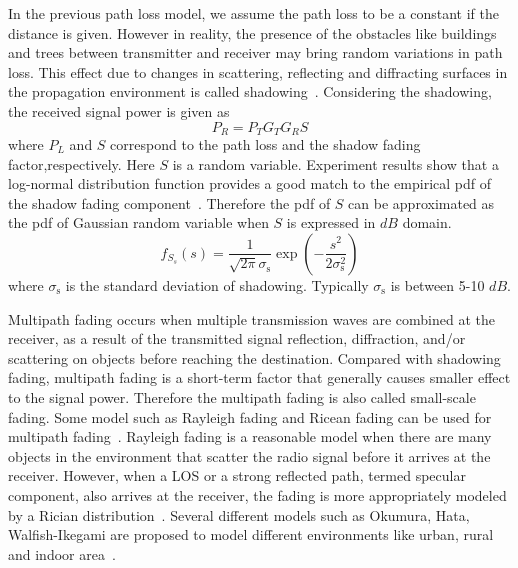 In the previous path loss model, we assume the path loss to be a constant if the distance is given. However in reality, the presence of the obstacles like buildings and trees between transmitter and receiver may bring random variations in path loss. This effect due to changes in scattering, reflecting and diffracting surfaces in the propagation environment is called shadowing~\cite{rappaport1996wireless}. Considering the shadowing, the received signal power is given as
\begin{equation}
P_{R} = P_{T} G_{T} G_{R} S
\end{equation}
where $P_{L}$ and $S$ correspond to the path loss and the shadow fading factor,respectively. Here $S$ is a random variable.
Experiment results show that a log-normal distribution function provides a good match to the empirical pdf of the shadow fading component~\cite{bertoni1999radio}. Therefore the pdf of $S$ can be approximated as the pdf of Gaussian random variable when $S$ is expressed in $dB$ domain.
\begin{equation} 
f_{S_{s}} (s)
= \frac{1}{\sqrt{2 \pi} \sigma_{\mathrm{s}}} 
\exp \left( - \frac{s^2}{2 \sigma_{\mathrm{s}}^2} \right)
\end{equation}
where $\sigma_{\mathrm{s}}$ is the standard deviation of shadowing. Typically $\sigma_{\mathrm{s}}$ is between 5-10 $dB$.

Multipath fading occurs when multiple transmission waves are combined
at the receiver, as a result of the transmitted signal reflection, diffraction, and/or scattering on objects before reaching the destination. Compared with shadowing fading, multipath fading is a short-term factor that generally causes smaller effect to the signal power. Therefore the multipath fading is also called small-scale fading.
Some model such as Rayleigh fading and Ricean fading can be used for multipath fading~\cite{rappaport1996wireless}. Rayleigh fading is a reasonable model when there are many objects in the environment that scatter the radio signal before it arrives at the receiver. However, when a LOS or a strong
reflected path, termed specular component, also arrives at the receiver, the fading is more appropriately modeled by a Rician distribution~\cite{stuber2011principles}.
Several different models such as Okumura, Hata, Walfish-Ikegami are proposed to model different environments like urban, rural and indoor area~\cite{stuber2011principles}.


